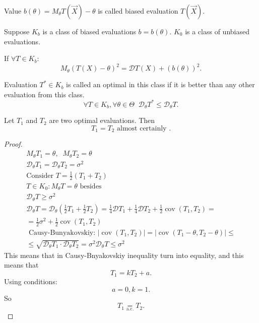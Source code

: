 \begin{definition}
    Value $b(\theta) = M_{\theta} T(\vec{X}) - \theta $ is called biased evaluation $T\left( \vec{X} \right) $.
\end{definition}
Suppose $K_b$ is a class of biased evaluations $b = b(\theta)$. $K_0$ is a class of unbiased evaluations.

\begin{remark}
    If $\forall T \in K_b$:
    \[
    M_{\theta} \left( T(X) - \theta \right) ^2 = \mathcal{D} T(X) + \left( b(\theta) \right) ^2
    .\] 
\end{remark}

\begin{definition}
    Evaluation $T^* \in K_b$ is called an optimal in this class if it is better than any other evaluation from this class.
    \[
    \forall T \in K_b, \forall \theta \in \Theta  \;\; \mathcal{D}_{\theta} T^* \leq \mathcal{D}_{\theta} T
    .\] 
\end{definition}

\begin{theorem}
    Let $T_1$ and $T_2$ are two optimal evaluations. Then \[
    T_1 = T_2 \text{ almost certainly }
    .\] 
\end{theorem}
\begin{proof}
    \begin{gather*}
        M_{\theta}T_1 = \theta, \;\; M_{\theta}T_2 = \theta\\
        \mathcal{D_{\theta}} T_1 = \mathcal{D}_{\theta} T_2 = \sigma^2 \\
        \text{Consider } T = \frac{1}{2} \left( T_1 + T_2 \right) \\
        T \in K_0 : M_{\theta} T = \theta \text{ besides } \\
        \mathcal{D}_{\theta} T \geq \sigma^2 \\
        \mathcal{D}_{\theta} T = \mathcal{D}_{\theta} \left( \frac{1}{2} T_1 + \frac{1}{2} T_2 \right)  = \frac{1}{4} \mathcal{D} T_1 + \frac{1}{4} \mathcal{D}T_2 + \frac{1}{2} \operatorname{cov}(T_1, T_2) = \\
        = \frac{1}{2} \sigma^2 + \frac{1}{2} \operatorname{cov}(T_1, T_2) \\
        \text{ Causy-Bunyakovskiy: }
        \left| \operatorname{cov}(T_1, T_2) \right|  = \left| \operatorname{cov}(T_1 - \theta, T_2 - \theta) \right|  \leq \\
        \leq \sqrt{\mathcal{D}_{\theta} T_1 \cdot \mathcal{D}_{\theta}T_2}  = \sigma^2
        \mathcal{D}_{\theta}T \leq \sigma^2
    \end{gather*}
    This means that in Causy-Bnyakovskiy inequality turn into equality, and this means that \[
    T_1 = k T_2 + a
    .\] 
    Using conditions:
    \[
    a = 0, k = 1
    .\] 
    So
    \[
    T_1 \underset{\text{a.c.}}{=} T_2
    .\] 
\end{proof}

